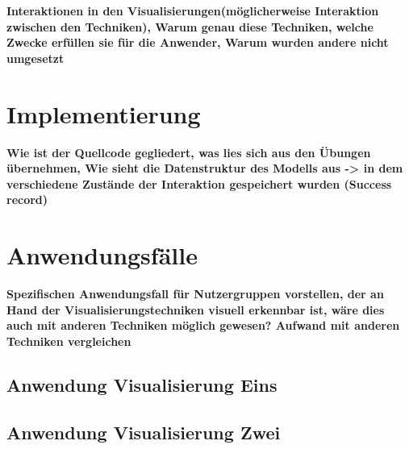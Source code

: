 \documentclass[usegeometry=true]{scrartcl}
\begin{document}
\textbf{Interaktionen in den Visualisierungen(möglicherweise Interaktion zwischen den Techniken), Warum genau diese Techniken, welche Zwecke erfüllen sie für die Anwender, Warum wurden andere nicht umgesetzt}

\section{Implementierung}


\textbf{Wie ist der Quellcode gegliedert, was lies sich aus den Übungen übernehmen, Wie sieht die Datenstruktur des Modells aus -> in dem verschiedene Zustände der Interaktion gespeichert wurden (Success record)}

\section{Anwendungsfälle}

\textbf{Spezifischen Anwendungsfall für Nutzergruppen vorstellen, der an Hand der Visualisierungstechniken visuell erkennbar ist, wäre dies auch mit anderen Techniken möglich gewesen? Aufwand mit anderen Techniken vergleichen}
\subsection{Anwendung Visualisierung Eins}



\subsection{Anwendung Visualisierung Zwei}
\end{document}
